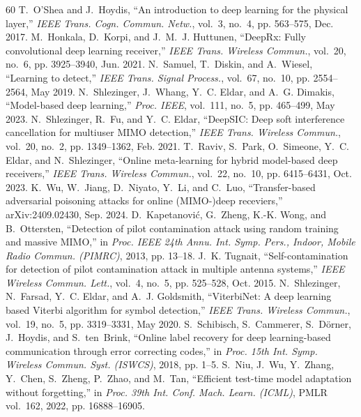 \documentclass[journal]{IEEEtran}
\theoremstyle{remark}
\begin{document}
\scriptsize\begin{thebibliography}{60}
 T.~O'Shea and J.~Hoydis, ``An introduction to deep learning for the physical layer,'' \emph{IEEE Trans. Cogn. Commun. Netw.}, vol.~3, no.~4, pp. 563--575, Dec. 2017.
 M.~Honkala, D.~Korpi, and J.~M.~J. Huttunen, ``DeepRx: Fully convolutional deep learning receiver,'' \emph{IEEE Trans. Wireless Commun.}, vol.~20, no.~6, pp. 3925--3940, Jun. 2021.
 N.~Samuel, T.~Diskin, and A.~Wiesel, ``Learning to detect,'' \emph{IEEE Trans. Signal Process.}, vol.~67, no.~10, pp. 2554--2564, May 2019.
 N.~Shlezinger, J.~Whang, Y.~C. Eldar, and A.~G. Dimakis, ``Model-based deep learning,'' \emph{Proc. IEEE}, vol.~111, no.~5, pp. 465--499, May 2023.
 N.~Shlezinger, R.~Fu, and Y.~C. Eldar, ``DeepSIC: Deep soft interference cancellation for multiuser MIMO detection,'' \emph{IEEE Trans. Wireless Commun.}, vol.~20, no.~2, pp. 1349--1362, Feb. 2021.
 T.~Raviv, S.~Park, O.~Simeone, Y.~C. Eldar, and N.~Shlezinger, ``Online meta-learning for hybrid model-based deep receivers,'' \emph{IEEE Trans. Wireless Commun.}, vol.~22, no.~10, pp. 6415--6431, Oct. 2023.
 K.~Wu, W.~Jiang, D.~Niyato, Y.~Li, and C.~Luo, ``Transfer-based adversarial poisoning attacks for online (MIMO-)deep receviers,'' arXiv:2409.02430, Sep. 2024.
 D.~Kapetanovi\'c, G.~Zheng, K.-K. Wong, and B.~Ottersten, ``Detection of pilot contamination attack using random training and massive MIMO,'' in \emph{Proc. IEEE 24th Annu. Int. Symp. Pers., Indoor, Mobile Radio Commun. (PIMRC)}, 2013, pp. 13--18.
 J.~K. Tugnait, ``Self-contamination for detection of pilot contamination attack in multiple antenna systems,'' \emph{IEEE Wireless Commun. Lett.}, vol.~4, no.~5, pp. 525--528, Oct. 2015.
 N.~Shlezinger, N.~Farsad, Y.~C. Eldar, and A.~J. Goldsmith, ``ViterbiNet: A deep learning based Viterbi algorithm for symbol detection,'' \emph{IEEE Trans. Wireless Commun.}, vol.~19, no.~5, pp. 3319--3331, May 2020.
 S.~Schibisch, S.~Cammerer, S.~D{\"o}rner, J.~Hoydis, and S.~ten~Brink, ``Online label recovery for deep learning-based communication through error correcting codes,'' in \emph{Proc. 15th Int. Symp. Wireless Commun. Syst. (ISWCS)}, 2018, pp. 1--5.
 S.~Niu, J.~Wu, Y.~Zhang, Y.~Chen, S.~Zheng, P.~Zhao, and M.~Tan, ``Efficient test-time model adaptation without forgetting,'' in \emph{Proc. 39th Int. Conf. Mach. Learn. (ICML)}, PMLR vol.~162, 2022, pp. 16888--16905.

\end{thebibliography}
\end{document}
